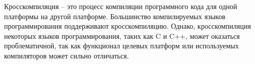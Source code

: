 Кросскомпиляция -- это процесс компиляции программного кода для одной платформы на другой платформе.
Большинство компилируемых языков программирования поддерживают кросскомпиляцию.
Однако, кросскомпиляция некоторых языков программирования, таких как C и C++, может оказаться проблематичной, так как функционал целевых платформ или используемых компиляторов может сильно отличаться.



